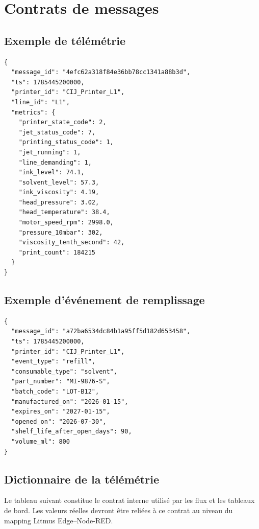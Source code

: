 \chapter{Contrats de messages}

\section{Exemple de télémétrie}

\begin{lstlisting}[language={},caption={Payload de télémétrie publié par le simulateur}]
{
  "message_id": "4efc62a318f84e36bb78cc1341a88b3d",
  "ts": 1785445200000,
  "printer_id": "CIJ_Printer_L1",
  "line_id": "L1",
  "metrics": {
    "printer_state_code": 2,
    "jet_status_code": 7,
    "printing_status_code": 1,
    "jet_running": 1,
    "line_demanding": 1,
    "ink_level": 74.1,
    "solvent_level": 57.3,
    "ink_viscosity": 4.19,
    "head_pressure": 3.02,
    "head_temperature": 38.4,
    "motor_speed_rpm": 2998.0,
    "pressure_10mbar": 302,
    "viscosity_tenth_second": 42,
    "print_count": 184215
  }
}
\end{lstlisting}

\section{Exemple d'événement de remplissage}

\begin{lstlisting}[language={},caption={Payload créant un nouveau lot de solvant}]
{
  "message_id": "a72ba6534dc84b1a95ff5d182d653458",
  "ts": 1785445200000,
  "printer_id": "CIJ_Printer_L1",
  "event_type": "refill",
  "consumable_type": "solvent",
  "part_number": "MI-9876-S",
  "batch_code": "LOT-B12",
  "manufactured_on": "2026-01-15",
  "expires_on": "2027-01-15",
  "opened_on": "2026-07-30",
  "shelf_life_after_open_days": 90,
  "volume_ml": 800
}
\end{lstlisting}

\section{Dictionnaire de la télémétrie}

Le tableau suivant constitue le contrat interne utilisé par les flux et les
tableaux de bord. Les valeurs réelles devront être reliées à ce contrat au
niveau du mapping Litmus Edge--Node-RED.

